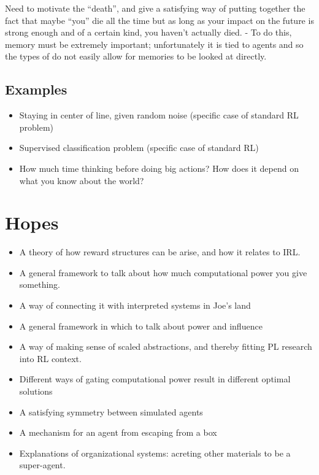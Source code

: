 \documentclass{article}
\begin{document}
	Need to motivate the ``death'', and give a satisfying way of putting together the fact that maybe ``you'' die all the time but as long as your impact on the future is strong enough and of a certain kind, you haven't actually died.
		- To do this, memory must be extremely important; unfortunately it is tied to agents and so the types of do not easily allow for memories to be looked at directly.

	
	\subsection{Examples}
	
	\begin{itemize}
		\setlength\itemsep{0pt}
		\item Staying in center of line, given random noise (specific case of standard RL problem)
		\item Supervised classification problem (specific case of standard RL)
		\item How much time thinking before doing big actions? How does it depend on what you know about the world?
	\end{itemize}

	\section{Hopes}
		\begin{itemize}
		\setlength\itemsep{0pt}
		\item A theory of how reward structures can be arise, and how it relates to IRL.
		\item A general framework to talk about how much computational power you give something.
		\item A way of connecting it with interpreted systems in Joe's land
		\item A general framework in which to talk about power and influence
		\item A way of making sense of scaled abstractions, and thereby fitting PL research into RL context.
		\item Different ways of gating computational power result in different optimal solutions
		\item A satisfying symmetry between simulated agents
		\item A mechanism for an agent from escaping from a box
		\item Explanations of organizational systems: acreting other materials to be a super-agent.
	\end{itemize}
\end{document}
